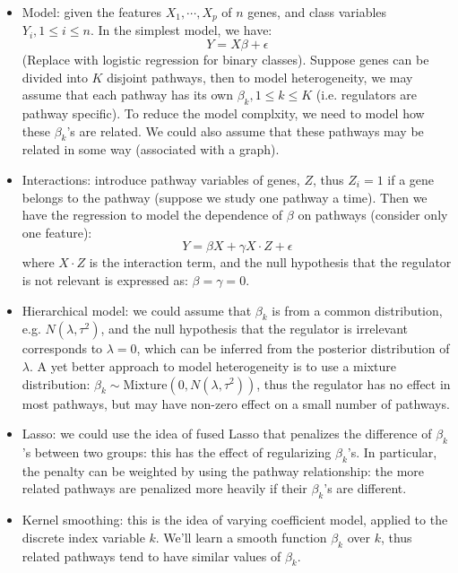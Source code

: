 \documentclass[11pt]{article}
\begin{document}
\begin{enumerate}
\begin{itemize}
\item Model: given the features $X_1, \cdots, X_p$ of $n$ genes, and class variables $Y_i, 1 \leq i \leq n$. In the simplest model, we have: 
\begin{equation}
Y = X \beta + \epsilon	
\end{equation}
(Replace with logistic regression for binary classes). Suppose genes can be divided into $K$ disjoint pathways, then to model heterogeneity, we may assume that each pathway has its own $\beta_k, 1 \leq k \leq K$ (i.e. regulators are pathway specific). To reduce the model complxity, we need to model how these $\beta_k$'s are related. We could also assume that these pathways may be related in some way (associated with a graph). 

\item Interactions: introduce pathway variables of genes, $Z$, thus $Z_i = 1$ if a gene belongs to the pathway (suppose we study one pathway a time). Then we have the regression to model the dependence of $\beta$ on pathways (consider only one feature): 
\begin{equation}
Y = \beta X  + \gamma X \cdot Z + \epsilon	
\end{equation}
where $X \cdot Z$ is the interaction term, and the null hypothesis that the regulator is not relevant is expressed as: $\beta = \gamma = 0$.

\item Hierarchical model: we could assume that $\beta_k$ is from a common distribution, e.g. $N(\lambda, \tau^2)$, and the null hypothesis that the regulator is irrelevant corresponds to $\lambda = 0$, which can be inferred from the posterior distribution of $\lambda$. A yet better approach to model heterogeneity is to use a mixture distribution: $\beta_k \sim \text{Mixture}(0, N(\lambda, \tau^2))$, thus the regulator has no effect in most pathways, but may have non-zero effect on a small number of pathways. 

\item Lasso: we could use the idea of fused Lasso that penalizes the difference of $\beta_k$'s between two groups: this has the effect of regularizing $\beta_k$'s. In particular, the penalty can be weighted by using the pathway relationship: the more related pathways are penalized more heavily if their $\beta_k$'s are different. 

\item Kernel smoothing: this is the idea of varying coefficient model, applied to the discrete index variable $k$. We'll learn a smooth function $\beta_k$ over $k$, thus related pathways tend to have similar values of $\beta_k$. 


\end{itemize}
\end{enumerate}
\end{document}
